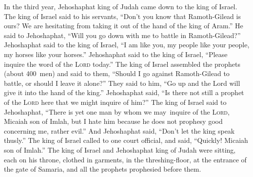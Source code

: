 \begin{inparaenum}
     In the third year, Jehoshaphat king of Judah came down to the king of Israel.%
     The king of Israel said to his servants, ``Don't you know that Ramoth-Gilead is ours? We are hesitating from taking it out of the hand of the king of Aram.''%
     He said to Jehoshaphat, ``Will you go down with me to battle in Ramoth-Gilead?'' Jehoshaphat said to the king of Israel, ``I am like you, my people like your people, my horses like your horses.''%
     Jehoshaphat said to the king of Israel, ``Please inquire the word of the \textsc{Lord} today.''%
     The king of Israel assembled the prophets (about 400~men) and said to them, ``Should I go against Ramoth-Gilead to battle, or should I leave it alone?'' They said to him, ``Go up and the Lord will give it into the hand of the king.''%
     Jehoshaphat said, ``Is there not still a prophet of the \textsc{Lord} here that we might inquire of him?''%
     The king of Israel said to Jehoshaphat, ``There is yet one man by whom we may\understood\ inquire of the \textsc{Lord}, Micaiah son of Imlah, but I hate him because he does not prophesy good concerning me, rather evil.'' And Jehoshaphat said, ``Don't let the king speak thusly.''%
     The king of Israel called to one court official, and said, ``Quickly! Micaiah son of Imlah.''%
     The king of Israel and Jehoshaphat king of Judah were sitting, each on his throne, clothed in garments, in the threshing-floor, at the entrance of the gate of Samaria, and all the prophets prophesied before them.%

\end{inparaenum}
